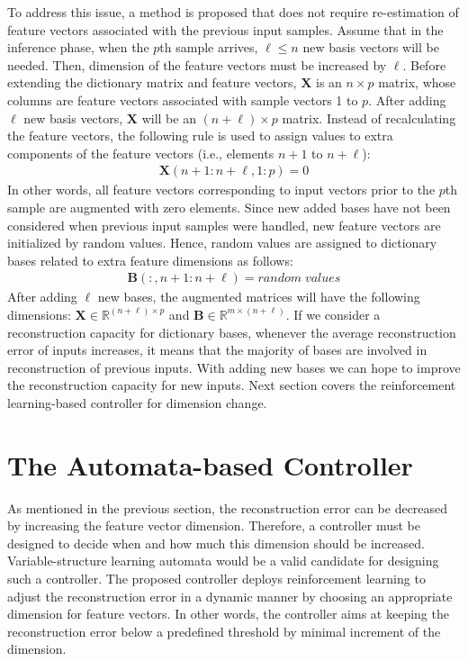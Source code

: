 \documentclass[journal]{IEEEtran}
\def\B{{\mathbf B}}
\def\X{{\mathbf X}}
\begin{document}
To address this issue, a method is proposed that does not require re-estimation of feature vectors associated with the previous input samples. Assume that in the inference phase, when the $p$th sample arrives, $\ell \le n$ new basis vectors will be needed. Then, dimension of the feature vectors must be increased by $\ell$. Before extending the dictionary matrix and feature vectors, $\X$  is an $n \times p$ matrix, whose columns are feature vectors associated with sample vectors 1 to $p$. After adding $\ell$ new basis vectors, $\X$ will be an $(n+\ell) \times p$ matrix. Instead of recalculating the feature vectors, the following rule is used to assign values to extra components of the feature vectors (i.e., elements $n+1$ to $n+\ell$):
    \begin{eqnarray} \label{eq:Xupdate}
    \X(n+1:n+\ell , 1:p) = 0 
    \end{eqnarray}
In other words, all feature vectors corresponding to input vectors prior to the $p$th sample are augmented with zero elements. Since new added bases have not been considered when previous input samples were handled, new feature vectors are initialized by random values. Hence, random values are assigned to dictionary bases related to extra feature dimensions as follows:
    \begin{eqnarray} \label{eq:Xupdate2}
    \B(:, n+1:n+\ell) = random \; values 
    \end{eqnarray}
After adding $\ell$ new bases, the augmented matrices will have the following dimensions: $\X \in \mathbb{R}^{(n+\ell) \times p}$ and $\B \in \mathbb{R}^{m \times (n+\ell)}$. If we consider a reconstruction capacity for dictionary bases, whenever the average reconstruction error of inputs increases, it means that the majority of bases are involved in reconstruction of previous inputs. With adding new bases we can hope to improve the reconstruction capacity for new inputs. Next section covers the reinforcement learning-based controller for dimension change.

\section{The Automata-based Controller} 
\label{controller}

As mentioned in the previous section, the reconstruction error can be decreased by increasing the feature vector dimension. Therefore, a controller must be designed to decide when and how much this dimension should be increased. Variable-structure learning automata would be a valid candidate for designing such a controller. The proposed controller deploys reinforcement learning to adjust the reconstruction error in a dynamic manner by choosing an appropriate dimension for feature vectors. In other words, the controller aims at keeping the reconstruction error below a predefined threshold by minimal increment of the dimension. 
\end{document}
